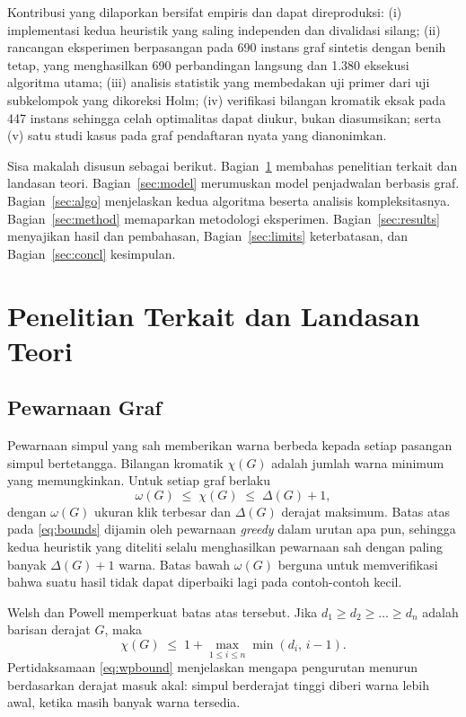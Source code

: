 \documentclass[conference,a4paper]{IEEEtran}
\begin{document}
Kontribusi yang dilaporkan bersifat empiris dan dapat direproduksi:
(i) implementasi kedua heuristik yang saling independen dan divalidasi silang;
(ii) rancangan eksperimen berpasangan pada 690 instans graf sintetis dengan
benih tetap, yang menghasilkan 690 perbandingan langsung dan 1.380 eksekusi
algoritma utama;
(iii) analisis statistik yang membedakan uji primer dari uji subkelompok yang
dikoreksi Holm; (iv) verifikasi bilangan kromatik eksak pada 447 instans
sehingga celah optimalitas dapat diukur, bukan diasumsikan; serta (v) satu studi
kasus pada graf pendaftaran nyata yang dianonimkan.

Sisa makalah disusun sebagai berikut. Bagian~\ref{sec:related} membahas
penelitian terkait dan landasan teori. Bagian~\ref{sec:model} merumuskan model
penjadwalan berbasis graf. Bagian~\ref{sec:algo} menjelaskan kedua algoritma
beserta analisis kompleksitasnya. Bagian~\ref{sec:method} memaparkan
metodologi eksperimen. Bagian~\ref{sec:results} menyajikan hasil dan
pembahasan, Bagian~\ref{sec:limits} keterbatasan, dan Bagian~\ref{sec:concl}
kesimpulan.

\section{Penelitian Terkait dan Landasan Teori}
\label{sec:related}

\subsection{Pewarnaan Graf}
Pewarnaan simpul yang sah memberikan warna berbeda kepada setiap pasangan
simpul bertetangga. Bilangan kromatik $\chi(G)$ adalah jumlah warna minimum
yang memungkinkan. Untuk setiap graf berlaku
\begin{equation}
\omega(G) \;\le\; \chi(G) \;\le\; \Delta(G)+1,
\label{eq:bounds}
\end{equation}
dengan $\omega(G)$ ukuran klik terbesar dan $\Delta(G)$ derajat maksimum.
Batas atas pada \eqref{eq:bounds} dijamin oleh pewarnaan \emph{greedy} dalam
urutan apa pun, sehingga kedua heuristik yang diteliti selalu menghasilkan
pewarnaan sah dengan paling banyak $\Delta(G)+1$ warna. Batas bawah $\omega(G)$
berguna untuk memverifikasi bahwa suatu hasil tidak dapat diperbaiki lagi pada
contoh-contoh kecil.

Welsh dan Powell \cite{welsh1967upper} memperkuat batas atas tersebut. Jika
$d_1 \ge d_2 \ge \dots \ge d_n$ adalah barisan derajat $G$, maka
\begin{equation}
\chi(G) \;\le\; 1 + \max_{1 \le i \le n} \min\left(d_i,\, i-1\right).
\label{eq:wpbound}
\end{equation}
Pertidaksamaan \eqref{eq:wpbound} menjelaskan mengapa pengurutan menurun
berdasarkan derajat masuk akal: simpul berderajat tinggi diberi warna lebih
awal, ketika masih banyak warna tersedia.
\end{document}

